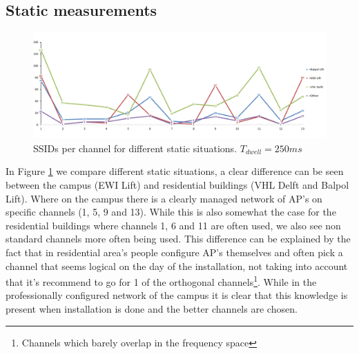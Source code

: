 \documentclass[11pt,a4paper]{article}
\begin{document}
\subsection{Static measurements}
\begin{figure}[h!]
\centering
\includegraphics[scale=0.3]{static_per_channel_graph3.png}
\caption{SSIDs per channel for different static situations. $T_{dwell}=250ms$}
\label{fig:static_per_channel_graph}
\end{figure}
In Figure \ref{fig:static_per_channel_graph} we compare different static situations, a clear difference can be seen between the campus (EWI Lift) and residential buildings (VHL Delft and Balpol Lift).
Where on the campus there is a clearly managed network of AP's on specific channels (1, 5, 9 and 13). While this is also somewhat the case for the residential buildings where channels 1, 6 and 11 are often used, we also see non standard channels more often being used. This difference can be explained by the fact that in residential area's people configure AP's themselves and often pick a channel that seems logical on the day of the installation, not taking into account that it's recommend to go for 1 of the orthogonal channels\footnote{Channels which barely overlap in the frequency space}. While in the professionally configured network of the campus it is clear that this knowledge is present when installation is done and the better channels are chosen.
\end{document}
